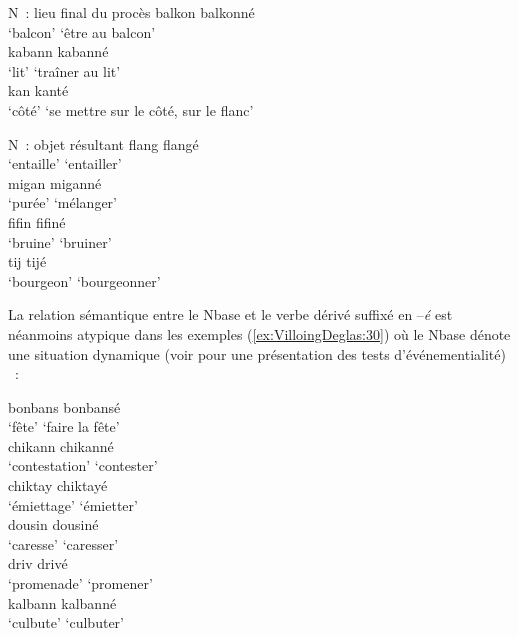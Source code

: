 \documentclass[output=paper]{langsci/langscibook}
\begin{document}
  \ea\label{ex:VilloingDeglas:28b} N~: lieu final du procès
  \ea \gll balkon \textrightarrow{~} balkonné \\
  `balcon' {} {`être au balcon'}\\
  \ex \gll kabann \textrightarrow{~} kabanné\\
  {`lit'} {} {`traîner au lit'}\\
  \ex \gll kan \textrightarrow{~} kanté\\
  {`côté'} {} {`se mettre sur le côté, sur le flanc'}\\
  \z\z

\ex \label{ex:VilloingDeglas:29} N~: objet résultant
  \ea \gll flang \textrightarrow{~} flangé\\
  {`entaille'} {} {`entailler'}\\
  \ex \gll migan \textrightarrow{~} miganné\\
  {`purée'} {} {`mélanger'}\\
  \ex \gll fifin \textrightarrow{~} fifiné\\
  {`bruine'} {} {`bruiner'}\\
  \ex \gll tij \textrightarrow{~} tijé\\
  {`bourgeon'} {} {`bourgeonner'}\\
\z\z

La relation sémantique entre le Nbase et le verbe dérivé suffixé en
--\emph{é} est néanmoins atypique dans les exemples (\ref{ex:VilloingDeglas:30}) où le Nbase
dénote une situation dynamique %
(voir %
\citealt{Villoing16} %
%
pour une présentation des tests d'événementialité)
%
~:

\ea \label{ex:VilloingDeglas:30}
  \ea \gll bonbans \textrightarrow{~} bonbansé\\
  {`fête'} {} {`faire la fête'}\\
  \ex \gll chikann \textrightarrow{~} chikanné\\
  {`contestation'} {} {`contester'}\\
  \ex \gll chiktay \textrightarrow{~} chiktayé\\
  {`émiettage'} {} {`émietter'}\\
  \ex \gll dousin \textrightarrow{~} dousiné\\
  {`caresse'} {} {`caresser'}\\ 
  \ex \gll driv \textrightarrow{~} drivé\\
  {`promenade'} {} {`promener'}\\
  \ex \gll kalbann \textrightarrow{~} kalbanné\\
  {`culbute'} {} {`culbuter'}\\
\z\z
\end{document}
